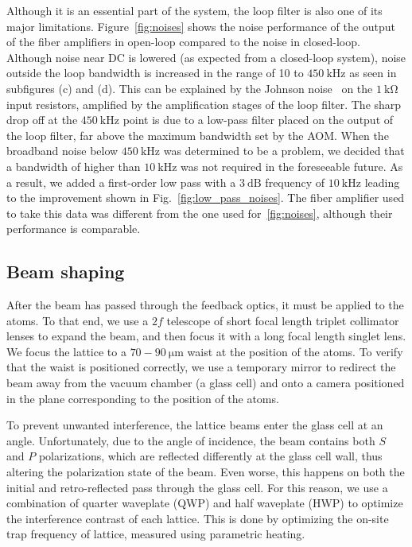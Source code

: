 \documentclass[twocolumn,aps,pra,showpacs,preprintnumbers,bibnotes]{revtex4-1}
\newcommand\unit[2]{\ensuremath{#1~\mathrm{{#2}}}}
\begin{document}
Although it is an essential part of the system, the loop filter is also one of its major limitations. Figure~\ref{fig:noises} shows the noise performance of the output of the fiber amplifiers in open-loop compared to the noise in closed-loop. Although noise near DC is lowered (as expected from a closed-loop system), noise outside the loop bandwidth is increased in the range of 10 to \unit{450}{kHz} as seen in subfigures (c) and (d).
This can be explained by the Johnson noise~\cite{Horowitz2015} on the \unit{1}{k\Omega} input resistors, amplified by the amplification stages of the loop filter.
The sharp drop off at the \unit{450}{kHz} point is due to a low-pass filter placed on the output of the loop filter, far above the maximum bandwidth set by the AOM.
When the broadband noise below \unit{450}{kHz} was determined to be a problem, we decided that a bandwidth of higher than \unit{10}{kHz} was not required in the foreseeable future.
As a result, we added a first-order low pass with a \unit{3}{dB} frequency of \unit{10}{kHz} leading to the improvement shown in Fig.~\ref{fig:low_pass_noises}. The fiber amplifier used to take this data was different from the one used for~\ref{fig:noises}, although their performance is comparable.


\subsection{Beam shaping}
After the beam has passed through the feedback optics, it must be applied to the atoms. To that end, we use a $2f$ telescope of short focal length triplet collimator lenses to expand the beam, and then focus it with a long focal length singlet lens.
We focus the lattice to a \unit{70-90}{\mu{}m} waist at the position of the atoms.
To verify that the waist is positioned correctly, we use a temporary mirror to redirect the beam away from the vacuum chamber (a glass cell) and onto a camera positioned in the plane corresponding to the position of the atoms.

To prevent unwanted interference, the lattice beams enter the glass cell at an angle.
Unfortunately, due to the angle of incidence, the beam contains both $S$ and $P$ polarizations, which are reflected differently at the glass cell wall, thus altering the polarization state of the beam.
Even worse, this happens on both the initial and retro-reflected pass through the glass cell.
For this reason, we use a combination of quarter waveplate (QWP) and half waveplate (HWP) to optimize the interference contrast of each lattice.
This is done by optimizing the on-site trap frequency of lattice, measured using parametric heating.
\end{document}
